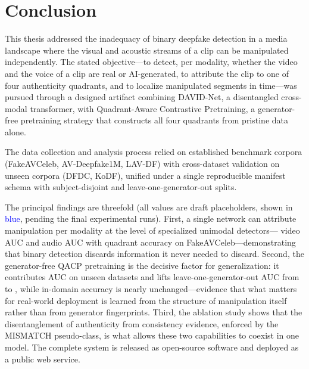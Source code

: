 \chapter*{Conclusion}

This thesis addressed the inadequacy of binary deepfake detection in a media
landscape where the visual and acoustic streams of a clip can be manipulated
independently. The stated objective---to detect, per modality, whether the
video and the voice of a clip are real or AI-generated, to attribute the clip
to one of four authenticity quadrants, and to localize manipulated segments in
time---was pursued through a designed artifact combining DAVID-Net, a
disentangled cross-modal transformer, with Quadrant-Aware Contrastive
Pretraining, a generator-free pretraining strategy that constructs all four
quadrants from pristine data alone.

The data collection and analysis process relied on established benchmark
corpora (FakeAVCeleb, AV-Deepfake1M, LAV-DF) with cross-dataset validation on
unseen corpora (DFDC, KoDF), unified under a single reproducible manifest
schema with subject-disjoint and leave-one-generator-out splits.

The principal findings are threefold (all values are draft placeholders,
shown in \textcolor{blue}{blue}, pending the final experimental runs).
First, a single network can attribute manipulation per modality at the level
of specialized unimodal detectors--- video AUC and
 audio AUC with  quadrant accuracy on
FakeAVCeleb---demonstrating that binary detection discards information it
never needed to discard. Second, the generator-free QACP pretraining is the
decisive factor for generalization: it contributes  AUC on
unseen datasets and lifts leave-one-generator-out AUC from  to
, while in-domain accuracy is nearly unchanged---evidence that
what matters for real-world deployment is learned from the structure of
manipulation itself rather than from generator fingerprints. Third, the
ablation study shows that the disentanglement of authenticity from
consistency evidence, enforced by the MISMATCH pseudo-class, is what allows
these two capabilities to coexist in one model. The complete system is
released as open-source software and deployed as a public web service.


